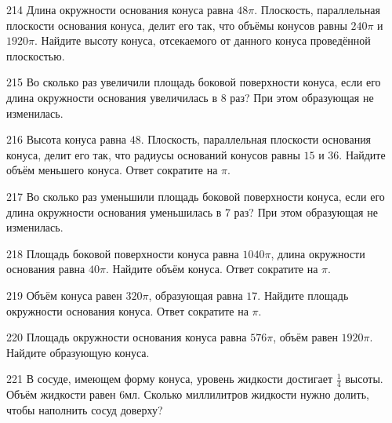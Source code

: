 \documentclass[a4paper]{article}
\begin{document}
\begin{taskBN}{214}
Длина окружности основания конуса равна $48\pi$. Плоскость, параллельная плоскости основания конуса,  делит его так, что объёмы конусов равны $240\pi$ и $1920\pi$. Найдите высоту конуса, отсекаемого от данного конуса проведённой плоскостью. 
\end{taskBN}

\begin{taskBN}{215}
Во сколько раз увеличили площадь боковой поверхности конуса, если его длина окружности основания увеличилась в 8 раз? При этом образующая не изменилась.
\end{taskBN}

\begin{taskBN}{216}
Высота конуса равна $48$. Плоскость, параллельная плоскости основания конуса,  делит его так, что радиусы оснований конусов равны $15$ и $36$. Найдите объём меньшего конуса. Ответ сократите на $\pi$.
\end{taskBN}

\begin{taskBN}{217}
Во сколько раз уменьшили площадь боковой поверхности конуса, если его длина окружности основания уменьшилась в 7 раз? При этом образующая не изменилась.
\end{taskBN}

\begin{taskBN}{218}
Площадь боковой поверхности конуса равна $1040\pi$, длина окружности основания равна $40\pi$. Найдите объём конуса. Ответ сократите на $\pi$.
\end{taskBN}

\begin{taskBN}{219}
Объём конуса равен $320\pi$, образующая равна $17$. Найдите площадь окружности основания конуса. Ответ сократите на $\pi$.
\end{taskBN}

\begin{taskBN}{220}
Площадь окружности основания конуса равна $576\pi$, объём равен $1920\pi$. Найдите образующую конуса. 
\end{taskBN}

\begin{taskBN}{221}
В сосуде, имеющем форму конуса, уровень жидкости достигает $\frac{1}{4}$ высоты. Объём жидкости равен 6мл. Сколько миллилитров жидкости нужно долить, чтобы наполнить сосуд доверху?
\end{taskBN}
\end{document}
